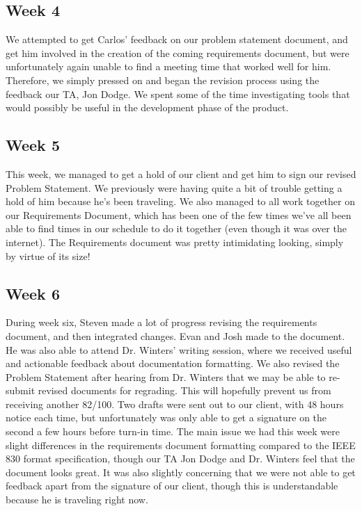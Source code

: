 \documentclass[onecolumn, draftclsnofoot,10pt, compsoc]{IEEEtran}
\begin{document}
\subsection{Week 4}
We attempted to get Carlos' feedback on our problem statement document, 
and get him involved in the creation of the coming requirements document, 
but were unfortunately again unable to find a meeting time that worked 
well for him. Therefore, we simply pressed on and began the revision process 
using the feedback our TA, Jon Dodge. We spent some of the time investigating 
tools that would possibly be useful in the development phase of the product.

\subsection{Week 5}
This week, we managed to get a hold of our client and get him to sign our 
revised Problem Statement. We previously were having quite a bit of trouble 
getting a hold of him because he's been traveling. We also managed to all 
work together on our Requirements Document, which has been one of the few 
times we've all been able to find times in our schedule to do it together 
(even though it was over the internet). The Requirements document was 
pretty intimidating looking, simply by virtue of its size!

\subsection{Week 6}
During week six, Steven made a lot of progress revising the requirements document, 
and then integrated changes. Evan and Josh made to the document. He was also able 
to attend Dr. Winters' writing session, where we received useful and actionable 
feedback about documentation formatting. We also revised the Problem Statement 
after hearing from Dr. Winters that we may be able to re-submit revised documents 
for regrading. This will hopefully prevent us from receiving another 82/100. 
Two drafts were sent out to our client, with 48 hours notice each time, but 
unfortunately was only able to get a signature on the second a few hours before 
turn-in time. The main issue we had this week were slight differences in the 
requirements document formatting compared to the IEEE 830 format specification, 
though our TA Jon Dodge and Dr. Winters feel that the document looks great. 
It was also slightly concerning that we were not able to get feedback apart 
from the signature of our client, though this is understandable because he is 
traveling right now.
\end{document}
